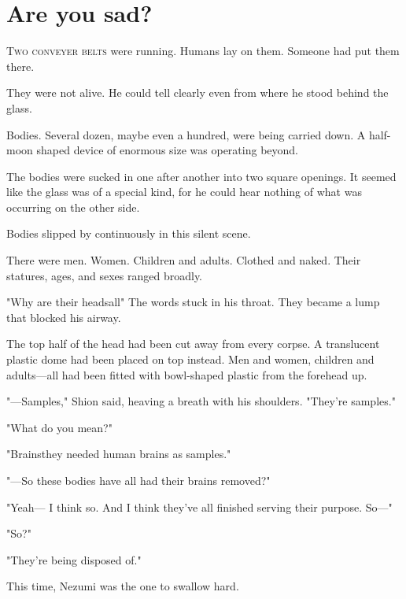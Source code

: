 
\chapter{Are you sad?}


\lettrine{T}{wo conveyer belts} were running. Humans lay on them. Someone had put
them there.

They were not alive. He could tell clearly even from where he stood
behind the glass.

Bodies. Several dozen, maybe even a hundred, were being carried down. A
half-moon shaped device of enormous size was operating beyond.

The bodies were sucked in one after another into two square openings. It
seemed like the glass was of a special kind, for he could hear nothing
of what was occurring on the other side.

Bodies slipped by continuously in this silent scene.

There were men. Women. Children and adults. Clothed and naked. Their
statures, ages, and sexes ranged broadly.

"Why are their heads\el all\el " The words stuck in his throat. They
became a lump that blocked his airway.

The top half of the head had been cut away from every corpse. A
translucent plastic dome had been placed on top instead. Men and women,
children and adults---all had been fitted with bowl-shaped plastic from
the forehead up.

"---Samples," Shion said, heaving a breath with his shoulders. "They're
samples."

"What do you mean?"

"Brains\el they needed human brains as samples."

"---So these bodies have all had their brains removed?"

"Yeah--- I think so. And I think they've all finished serving their
purpose. So---"

"So?"

"They're being disposed of."

This time, Nezumi was the one to swallow hard.

